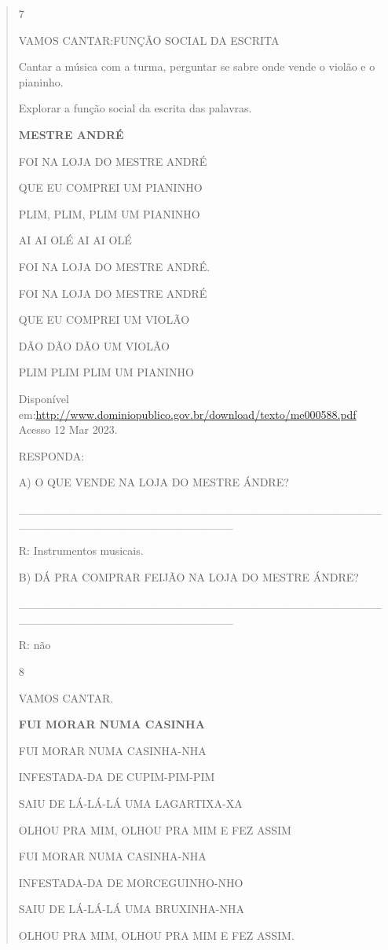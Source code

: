\begin{verse}
{\num{7}

VAMOS CANTAR:FUNÇÃO SOCIAL DA ESCRITA

Cantar a música com a turma, perguntar se sabre onde vende o violão e o
pianinho.

Explorar a função social da escrita das palavras.

\textbf{MESTRE ANDRÉ}

FOI NA LOJA DO MESTRE ANDRÉ

QUE EU COMPREI UM PIANINHO

PLIM, PLIM, PLIM UM PIANINHO

AI AI OLÉ AI AI OLÉ

FOI NA LOJA DO MESTRE ANDRÉ.

FOI NA LOJA DO MESTRE ANDRÉ

QUE EU COMPREI UM VIOLÃO

DÃO DÃO DÃO UM VIOLÃO

PLIM PLIM PLIM UM PIANINHO

Disponível
em:\url{http://www.dominiopublico.gov.br/download/texto/me000588.pdf}
Acesso 12 Mar 2023.

RESPONDA:

A) O QUE VENDE NA LOJA DO MESTRE ÁNDRE?

\_\_\_\_\_\_\_\_\_\_\_\_\_\_\_\_\_\_\_\_\_\_\_\_\_\_\_\_\_\_\_\_\_\_\_\_\_\_\_\_\_\_\_\_\_\_\_\_\_\_\_\_\_\_\_\_\_\_\_\_\_\_\_\_\_\_\_\_\_\_

R: Instrumentos musicais.

B) DÁ PRA COMPRAR FEIJÃO NA LOJA DO MESTRE ÁNDRE?

\_\_\_\_\_\_\_\_\_\_\_\_\_\_\_\_\_\_\_\_\_\_\_\_\_\_\_\_\_\_\_\_\_\_\_\_\_\_\_\_\_\_\_\_\_\_\_\_\_\_\_\_\_\_\_\_\_\_\_\_\_\_\_\_\_\_\_\_\_\_

R: não

\num{8}

VAMOS CANTAR.

\textbf{FUI MORAR NUMA CASINHA}

FUI MORAR NUMA CASINHA-NHA

INFESTADA-DA DE CUPIM-PIM-PIM

SAIU DE LÁ-LÁ-LÁ UMA LAGARTIXA-XA

OLHOU PRA MIM, OLHOU PRA MIM E FEZ ASSIM

FUI MORAR NUMA CASINHA-NHA

INFESTADA-DA DE MORCEGUINHO-NHO

SAIU DE LÁ-LÁ-LÁ UMA BRUXINHA-NHA

OLHOU PRA MIM, OLHOU PRA MIM E FEZ ASSIM.

}
\end{verse}
